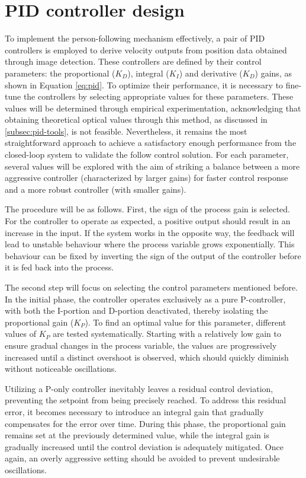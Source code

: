 \section{PID controller design}
\label{sec:test-1-pid}

To implement the person-following mechanism effectively, a pair of PID controllers is employed to derive velocity outputs from position data obtained through image detection. These controllers are defined by their control parameters: the proportional ($K_D$), integral ($K_I$) and derivative ($K_D$) gains, as shown in Equation \ref{eq:pid}. To optimize their performance, it is necessary to fine-tune the controllers by selecting appropriate values for these parameters. These values will be determined through empirical experimentation, acknowledging that obtaining theoretical optical values through this method, as discussed in \ref{subsec:pid-tools}, is not feasible. Nevertheless, it remains the most straightforward approach to achieve a satisfactory enough performance from the closed-loop system to validate the follow control solution. For each parameter, several values will be explored with the aim of striking a balance between a more aggressive controller (characterized by larger gains) for faster control response and a more robust controller (with smaller gains).

The procedure will be as follows. First, the sign of the process gain is selected. For the controller to operate as expected, a positive output should result in an increase in the input. If the system works in the opposite way, the feedback will lead to unstable behaviour where the process variable grows exponentially. This behaviour can be fixed by inverting the sign of the output of the controller before it is fed back into the process.

The second step will focus on selecting the control parameters mentioned before. In the initial phase, the controller operates exclusively as a pure P-controller, with both the I-portion and D-portion deactivated, thereby isolating the proportional gain ($K_P$). To find an optimal value for this parameter, different values of $K_P$ are tested systematically. Starting with a relatively low gain to ensure gradual changes in the process variable, the values are progressively increased until a distinct overshoot is observed, which should quickly diminish without noticeable oscillations.

Utilizing a P-only controller inevitably leaves a residual control deviation, preventing the setpoint from being precisely reached. To address this residual error, it becomes necessary to introduce an integral gain that gradually compensates for the error over time. During this phase, the proportional gain remains set at the previously determined value, while the integral gain is gradually increased until the control deviation is adequately mitigated. Once again, an overly aggressive setting should be avoided to prevent undesirable oscillations.

